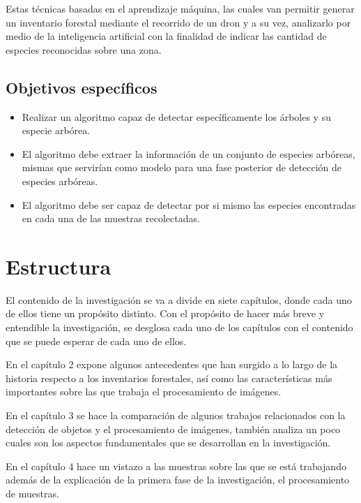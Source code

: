 Estas técnicas  basadas en el aprendizaje máquina, las cuales van permitir
generar un inventario forestal mediante el recorrido de un dron y a su vez, analizarlo por medio de la inteligencia artificial con la finalidad de indicar las cantidad de especies reconocidas sobre una zona.

\subsection{Objetivos específicos}
\begin{itemize}
\item Realizar un algoritmo capaz de detectar específicamente los árboles y su especie arbórea.
\end{itemize}

\begin{itemize}
\item El algoritmo debe extraer la información de un conjunto de especies arbóreas, mismas que servirían como modelo para una fase posterior de detección de especies arbóreas.
\end{itemize}

\begin{itemize}
\item El algoritmo debe ser capaz de detectar por si mismo las especies encontradas en cada una de las muestras recolectadas.
\end{itemize}

\pagebreak

\section{Estructura}
El contenido de la investigación se va a divide en siete capítulos, donde cada uno de ellos tiene un propósito distinto. Con el propósito de hacer más breve y entendible la investigación, se desglosa cada uno de los capítulos con el contenido que se puede esperar de cada uno de ellos.

En el capítulo 2 expone algunos antecedentes que han surgido a lo largo
de la historia respecto a los inventarios forestales, así como las características más importantes sobre las que trabaja el procesamiento de imágenes.

En el capítulo 3 se hace la comparación de algunos trabajos relacionados con la detección de objetos y el procesamiento de imágenes, también analiza un poco cuales son los aspectos fundamentales que se desarrollan en la investigación.

En el capítulo 4 hace un vistazo a las muestras sobre las que se está trabajando además de la explicación de la primera fase de la investigación, el procesamiento de muestras.

